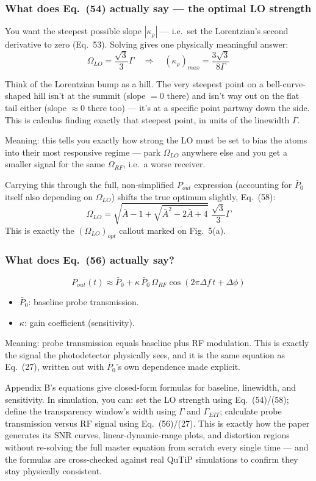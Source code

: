 \documentclass[11pt]{article}
\begin{document}
\subsubsection*{What does Eq.~(54) actually say --- the optimal LO strength}
You want the steepest possible slope $|\kappa_\rho|$ --- i.e.\ set the Lorentzian's second derivative to zero (Eq.~53). Solving gives one physically meaningful answer:
\[
\Omega_{LO}=\frac{\sqrt3}{3}\Gamma \quad\Rightarrow\quad (\kappa_\rho)_{max}=\frac{3\sqrt3}{8\Gamma}
\]
\begin{plain}
Think of the Lorentzian bump as a hill. The very steepest point on a bell-curve-shaped hill isn't at the summit (slope $=0$ there) and isn't way out on the flat tail either (slope $\approx0$ there too) --- it's at a specific point partway down the side. This is calculus finding exactly that steepest point, in units of the linewidth $\Gamma$.
\end{plain}
\begin{eqmeaning}
Meaning: this tells you exactly how strong the LO must be set to bias the atoms into their most responsive regime --- park $\Omega_{LO}$ anywhere else and you get a smaller signal for the same $\Omega_{RF}$, i.e.\ a worse receiver.
\end{eqmeaning}
Carrying this through the full, non-simplified $P_{out}$ expression (accounting for $\bar P_0$ itself also depending on $\Omega_{LO}$) shifts the true optimum slightly, Eq.~(58):
\[
\Omega_{LO} = \sqrt{\bar A - 1+\sqrt{\bar A^2-2\bar A+4}}\;\frac{\sqrt3}{3}\Gamma
\]
This is exactly the $(\Omega_{LO})_{opt}$ callout marked on Fig.~5(a).

\subsubsection*{What does Eq.~(56) actually say?}
\[
P_{out}(t) \approx \bar P_0 + \kappa\,\bar P_0\,\Omega_{RF}\cos(2\pi\Delta f\,t+\Delta\phi)
\]
\begin{itemize}
\item $\bar P_0$: baseline probe transmission.
\item $\kappa$: gain coefficient (sensitivity).
\end{itemize}
Meaning: probe transmission equals baseline plus RF modulation. This is exactly the signal the photodetector physically sees, and it is the same equation as Eq.~(27), written out with $\bar P_0$'s own dependence made explicit.

\begin{simuse}
Appendix B's equations give closed-form formulas for baseline, linewidth, and sensitivity. In simulation, you can: set the LO strength using Eq.~(54)/(58); define the transparency window's width using $\Gamma$ and $\Gamma_{EIT}$; calculate probe transmission versus RF signal using Eq.~(56)/(27). This is exactly how the paper generates its SNR curves, linear-dynamic-range plots, and distortion regions without re-solving the full master equation from scratch every single time --- and the formulas are cross-checked against real QuTiP simulations to confirm they stay physically consistent.
\end{simuse}
\end{document}
